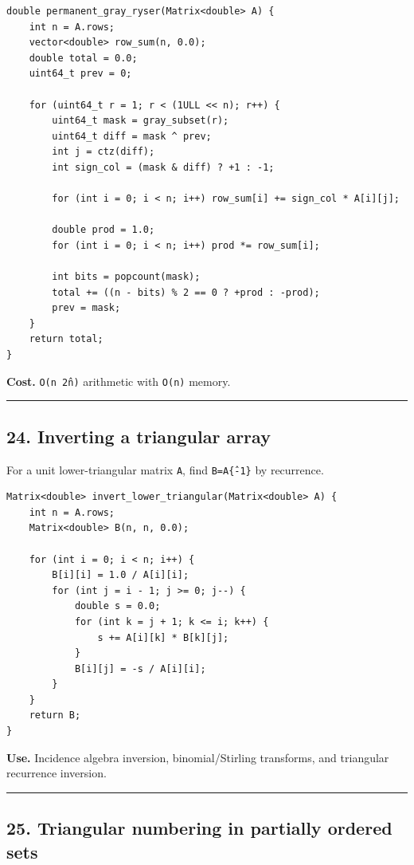 \documentclass[11pt]{article}
\begin{document}
\begin{verbatim}
double permanent_gray_ryser(Matrix<double> A) {
    int n = A.rows;
    vector<double> row_sum(n, 0.0);
    double total = 0.0;
    uint64_t prev = 0;

    for (uint64_t r = 1; r < (1ULL << n); r++) {
        uint64_t mask = gray_subset(r);
        uint64_t diff = mask ^ prev;
        int j = ctz(diff);
        int sign_col = (mask & diff) ? +1 : -1;

        for (int i = 0; i < n; i++) row_sum[i] += sign_col * A[i][j];

        double prod = 1.0;
        for (int i = 0; i < n; i++) prod *= row_sum[i];

        int bits = popcount(mask);
        total += ((n - bits) % 2 == 0 ? +prod : -prod);
        prev = mask;
    }
    return total;
}
\end{verbatim}

\textbf{Cost.} \texttt{O(n 2\^n)} arithmetic with \texttt{O(n)} memory.

\begin{center}\rule{0.5\linewidth}{0.5pt}\end{center}

\subsection{24. Inverting a triangular array}\label{inverting-a-triangular-array}

For a unit lower-triangular matrix \texttt{A}, find \texttt{B=A\^\{-1\}} by recurrence.

\begin{verbatim}
Matrix<double> invert_lower_triangular(Matrix<double> A) {
    int n = A.rows;
    Matrix<double> B(n, n, 0.0);

    for (int i = 0; i < n; i++) {
        B[i][i] = 1.0 / A[i][i];
        for (int j = i - 1; j >= 0; j--) {
            double s = 0.0;
            for (int k = j + 1; k <= i; k++) {
                s += A[i][k] * B[k][j];
            }
            B[i][j] = -s / A[i][i];
        }
    }
    return B;
}
\end{verbatim}

\textbf{Use.} Incidence algebra inversion, binomial/Stirling transforms, and triangular recurrence inversion.

\begin{center}\rule{0.5\linewidth}{0.5pt}\end{center}

\subsection{25. Triangular numbering in partially ordered sets}\label{triangular-numbering-in-partially-ordered-sets}
\end{document}
